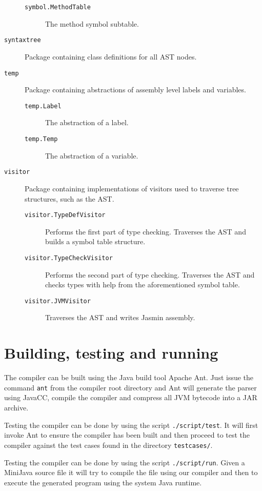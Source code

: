 \documentclass[a4paper]{article}
\begin{document}
\begin{description}
\begin{description}
        \item[\texttt{symbol.MethodTable}] The method symbol subtable.
    \end{description}
\item[\texttt{syntaxtree}] Package containing class definitions for all AST
    nodes.
\item[\texttt{temp}] Package containing abstractions of assembly level labels
    and variables.
    \begin{description}
        \item[\texttt{temp.Label}] The abstraction of a label.
        \item[\texttt{temp.Temp}] The abstraction of a variable.
    \end{description}
\item[\texttt{visitor}] Package containing implementations of visitors used to
    traverse tree structures, such as the AST.
    \begin{description}
        \item[\texttt{visitor.TypeDefVisitor}] Performs the first part of type
            checking. Traverses the AST and builds a symbol table structure.
        \item[\texttt{visitor.TypeCheckVisitor}] Performs the second part of
            type checking. Traverses the AST and checks types with help from the
            aforementioned symbol table.
        \item[\texttt{visitor.JVMVisitor}] Traverses the AST and writes Jasmin
            assembly.
    \end{description}
\end{description}

\section{Building, testing and running}

The compiler can be built using the Java build tool Apache Ant\texttrademark.
Just issue the command \texttt{ant} from the compiler root directory and Ant
will generate the parser using JavaCC, compile the compiler and compress all JVM
bytecode into a JAR archive.

Testing the compiler can be done by using the script \texttt{./script/test}. It
will first invoke Ant to ensure the compiler has been built and then proceed to
test the compiler against the test cases found in the directory
\texttt{testcases/}.

Testing the compiler can be done by using the script \texttt{./script/run}.
Given a MiniJava source file it will try to compile the file using our compiler
and then to execute the generated program using the system Java runtime.
\end{document}
